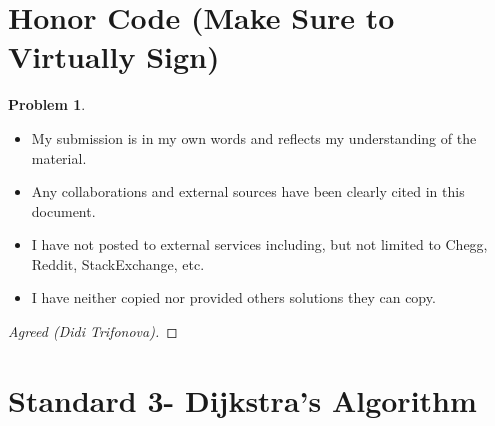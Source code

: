 \documentclass[11pt]{article}
\theoremstyle{definition}
\theoremstyle{definition}
\newtheorem{required}{Problem}
\theoremstyle{definition}
\begin{document}
\section{Honor Code (Make Sure to Virtually Sign)} \label{HonorCode}

\begin{required}
\begin{itemize}
\item My submission is in my own words and reflects my understanding of the material.
\item Any collaborations and external sources have been clearly cited in this document.
\item I have not posted to external services including, but not limited to Chegg, Reddit, StackExchange, etc.
\item I have neither copied nor provided others solutions they can copy.
\end{itemize}

\end{required}

\begin{proof}[Agreed (Didi Trifonova)]
\end{proof}



\newpage
\section{Standard 3- Dijkstra's Algorithm}
\end{document}

